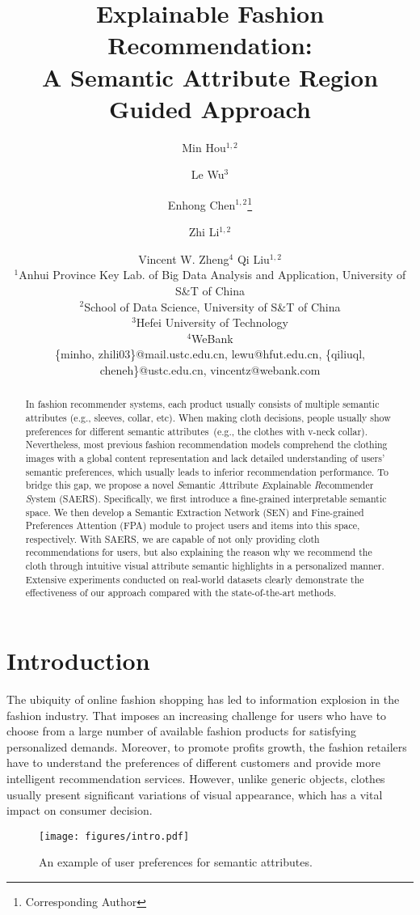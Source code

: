 \documentclass{article}
\title{Explainable Fashion Recommendation: \\A Semantic Attribute Region Guided Approach}
\author{
Min Hou$^{1,2}$\and
Le Wu$^3$\and
Enhong Chen$^{1,2}$\footnote{Corresponding Author}\and
Zhi Li$^{1,2}$\and
Vincent W. Zheng$^4$\And
Qi Liu$^{1,2}$\\
\affiliations
$^1$Anhui Province Key Lab. of Big Data Analysis and Application, University of S\&T of China\\
$^2$School of Data Science, University of S\&T of China\\
$^3$Hefei University of Technology\\
$^4$WeBank\\
\emails
\{minho, zhili03\}@mail.ustc.edu.cn,
lewu@hfut.edu.cn,
\{qiliuql, cheneh\}@ustc.edu.cn,
vincentz@webank.com
}
\begin{document}
\maketitle

\begin{abstract}

 In fashion recommender systems, each product usually consists of multiple semantic attributes (e.g., sleeves, collar, etc). When making cloth decisions, people usually show preferences for different semantic attributes~(e.g., the clothes with v-neck collar). Nevertheless, most previous fashion recommendation models comprehend the clothing images with a global content representation and lack detailed understanding of users' semantic preferences, which usually leads to inferior recommendation performance. To bridge this gap, we propose a novel \textit{S}emantic \textit{A}ttribute \textit{E}xplainable \textit{R}ecommender \textit{S}ystem (SAERS). Specifically, we first introduce a fine-grained interpretable semantic space. We then develop a Semantic Extraction Network (SEN) and Fine-grained Preferences Attention (FPA) module to project users and items into this space, respectively.  With SAERS, we are capable of not only providing cloth recommendations for users, but also explaining the reason why we recommend the cloth through intuitive visual attribute semantic highlights in a personalized manner. Extensive experiments conducted on real-world datasets clearly demonstrate the effectiveness of our approach compared with the state-of-the-art methods.
  
\end{abstract}


\section{Introduction}

The ubiquity of online fashion shopping has led to information explosion in the fashion industry. That imposes an increasing challenge for users who have to choose from a large number of available fashion products for satisfying personalized demands. Moreover, to promote profits growth, the fashion retailers have to understand the preferences of different customers and provide more intelligent recommendation services. However, unlike generic objects, clothes usually present significant variations of visual appearance, which has a vital impact on consumer decision.
\begin{figure}
    \centering
	\texttt{[image: figures/intro.pdf]}\caption{An example of user preferences for semantic attributes.}
    \centering
    \bigskip
    \label{fig:intro}
\end{figure}
\end{document}
